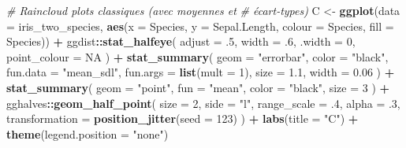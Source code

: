 \documentclass[
  french,
]{book}
\newenvironment{Shaded}{\begin{snugshade}}{\end{snugshade}}
\newcommand{\CommentTok}[1]{\textcolor[rgb]{0.56,0.35,0.01}{\textit{#1}}}
\newcommand{\DataTypeTok}[1]{\textcolor[rgb]{0.13,0.29,0.53}{#1}}
\newcommand{\DecValTok}[1]{\textcolor[rgb]{0.00,0.00,0.81}{#1}}
\newcommand{\FloatTok}[1]{\textcolor[rgb]{0.00,0.00,0.81}{#1}}
\newcommand{\KeywordTok}[1]{\textcolor[rgb]{0.13,0.29,0.53}{\textbf{#1}}}
\newcommand{\NormalTok}[1]{#1}
\newcommand{\OperatorTok}[1]{\textcolor[rgb]{0.81,0.36,0.00}{\textbf{#1}}}
\newcommand{\OtherTok}[1]{\textcolor[rgb]{0.56,0.35,0.01}{#1}}
\newcommand{\StringTok}[1]{\textcolor[rgb]{0.31,0.60,0.02}{#1}}
\begin{document}
\begin{Shaded}
\begin{Highlighting}[]
\CommentTok{# Raincloud plots classiques (avec moyennes et }
\CommentTok{# écart-types)}
\NormalTok{C <-}
\StringTok{  }\KeywordTok{ggplot}\NormalTok{(}\DataTypeTok{data =}\NormalTok{ iris_two_species, }
         \KeywordTok{aes}\NormalTok{(}\DataTypeTok{x =}\NormalTok{ Species, }\DataTypeTok{y =}\NormalTok{ Sepal.Length, }\DataTypeTok{colour =}\NormalTok{ Species, }\DataTypeTok{fill =}\NormalTok{ Species)) }\OperatorTok{+}
\StringTok{  }\NormalTok{ggdist}\OperatorTok{::}\KeywordTok{stat_halfeye}\NormalTok{(}
    \DataTypeTok{adjust =} \FloatTok{.5}\NormalTok{, }
    \DataTypeTok{width =} \FloatTok{.6}\NormalTok{, }
    \DataTypeTok{.width =} \DecValTok{0}\NormalTok{, }
    \DataTypeTok{point_colour =} \OtherTok{NA}
\NormalTok{    ) }\OperatorTok{+}
\StringTok{  }\KeywordTok{stat_summary}\NormalTok{(}
    \DataTypeTok{geom =} \StringTok{"errorbar"}\NormalTok{,}
    \DataTypeTok{color =} \StringTok{"black"}\NormalTok{,}
    \DataTypeTok{fun.data =} \StringTok{"mean_sdl"}\NormalTok{,}
    \DataTypeTok{fun.args =} \KeywordTok{list}\NormalTok{(}\DataTypeTok{mult =} \DecValTok{1}\NormalTok{),}
    \DataTypeTok{size =} \FloatTok{1.1}\NormalTok{, }
    \DataTypeTok{width =} \FloatTok{0.06}
\NormalTok{    ) }\OperatorTok{+}\StringTok{ }
\StringTok{  }\KeywordTok{stat_summary}\NormalTok{(}
    \DataTypeTok{geom =} \StringTok{"point"}\NormalTok{,}
    \DataTypeTok{fun =} \StringTok{"mean"}\NormalTok{, }
    \DataTypeTok{color =} \StringTok{"black"}\NormalTok{,}
    \DataTypeTok{size =} \DecValTok{3}
\NormalTok{    ) }\OperatorTok{+}
\StringTok{  }\NormalTok{gghalves}\OperatorTok{::}\KeywordTok{geom_half_point}\NormalTok{(}
    \DataTypeTok{size =} \DecValTok{2}\NormalTok{, }
    \DataTypeTok{side =} \StringTok{"l"}\NormalTok{, }
    \DataTypeTok{range_scale =} \FloatTok{.4}\NormalTok{, }
    \DataTypeTok{alpha =} \FloatTok{.3}\NormalTok{,}
    \DataTypeTok{transformation =} \KeywordTok{position_jitter}\NormalTok{(}\DataTypeTok{seed =} \DecValTok{123}\NormalTok{)}
\NormalTok{  ) }\OperatorTok{+}
\StringTok{  }\KeywordTok{labs}\NormalTok{(}\DataTypeTok{title =} \StringTok{"C"}\NormalTok{) }\OperatorTok{+}
\StringTok{  }\KeywordTok{theme}\NormalTok{(}\DataTypeTok{legend.position =} \StringTok{"none"}\NormalTok{)}



\end{Highlighting}
\end{Shaded}
\end{document}
